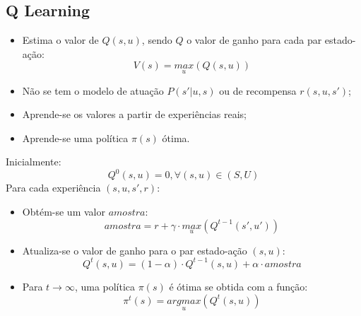 \documentclass{beamer}
\begin{document}

\subsection{Q Learning}

\begin{frame}
\begin{itemize}
	\item Estima o valor de $ Q \left( s, u \right) $, sendo $ Q $ o valor de ganho para cada par estado-ação:
		$$ V \left( s \right) = \underset{u}{max} \left( Q \left( s, u \right) \right) $$\pause
	\item Não se tem o modelo de atuação $ P \left(s' | u, s \right) $
	ou de recompensa $ r \left( s, u, s' \right) $;\pause
	\item Aprende-se os valores a partir de experiências reais;\pause
	\item Aprende-se uma política $ \pi \left( s \right) $ ótima.
\end{itemize}
\end{frame}


\begin{frame}
Inicialmente:
$$ Q^0 \left( s, u \right) = 0 , \forall \left( s, u \right) \in \left( S, U \right) $$\pause
Para cada experiência $ \left( s, u, s', r \right) $:\pause
\begin{itemize}
	\item Obtém-se um valor $ amostra $:
		$$ amostra = r + \gamma \cdot \underset{u}{max} \left( Q^{t-1} \left( s', u' \right) \right) $$\pause
	\item Atualiza-se o valor de ganho para o par estado-ação $ \left( s, u \right) $:
		$$ Q^t \left( s, u \right) = \left( 1 - \alpha \right) \cdot Q^{t-1} \left( s, u \right) + \alpha \cdot amostra $$\pause
	\item Para $ t \rightarrow \infty $, uma política $ \pi \left( s \right) $ é ótima se obtida com a função:
		$$ \pi^t \left( s \right) = \underset{u}{argmax} \left( Q^t \left( s, u \right) \right) $$
\end{itemize}
\end{frame}

\end{document}
